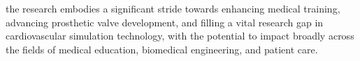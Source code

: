  the research embodies a significant stride towards enhancing medical training, advancing prosthetic valve development, and filling a vital research gap in cardiovascular simulation technology, with the potential to impact broadly across the fields of medical education, biomedical engineering, and patient care.






